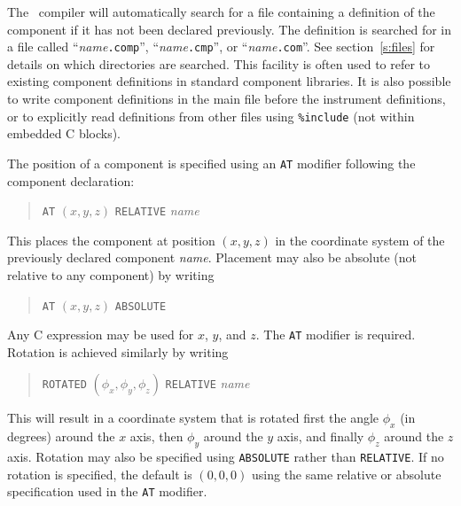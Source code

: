 The \MCS\ compiler will automatically search for a file containing a
definition of the component if it has not been declared previously. The
definition is searched for in a file called ``{\it name\/}{\tt .comp}'',
``{\it name\/}{\tt .cmp}'', or ``{\it name\/}{\tt .com}''. See
section~\ref{s:files} for details on which directories are searched. This
facility is often used to refer to existing component definitions in
standard component libraries. It is also possible to write component
definitions in the main file before the instrument definitions, or to
explicitly read definitions from other files using \verb+%include+ 
(not within embedded C blocks).

The position of a component is specified using an \texttt{AT} modifier
following the component declaration:
  
\begin{quote}
  \texttt{AT} $(x,y,z)$ \texttt{RELATIVE} \textit{name}
\end{quote}
This places the component at position $(x,y,z)$ in the coordinate system
of the previously declared component \textit{name}. Placement may also
be absolute (not relative to any component) by writing
\begin{quote}
  \texttt{AT} $(x,y,z)$ \texttt{ABSOLUTE}
\end{quote}
Any C expression may be used for $x$, $y$, and $z$. The \texttt{AT}
modifier is required.
Rotation is achieved similarly by writing 
\begin{quote}
  \texttt{ROTATED} $(\phi_x,\phi_y,\phi_z)$ \texttt{RELATIVE} \textit{name}
\end{quote}
This will result in a coordinate system that is rotated first the angle
$\phi_x$ (in degrees) around the $x$ axis, then $\phi_y$ around the $y$ axis, and finally
$\phi_z$ around the $z$ axis. Rotation may also be specified using
\texttt{ABSOLUTE} rather than \texttt{RELATIVE}. If no rotation is
specified, the default is $(0,0,0)$ using the same relative or absolute
specification used in the \texttt{AT} modifier.

